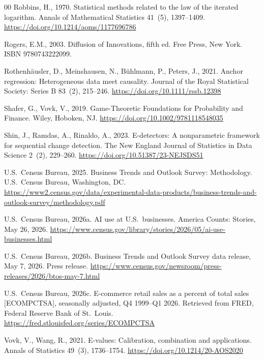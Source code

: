 \documentclass[review,authoryear,12pt]{elsarticle}
\begin{document}
\begin{thebibliography}{00}
Robbins, H., 1970. Statistical methods related to the law of the iterated logarithm. Annals of Mathematical Statistics 41~(5), 1397--1409. \url{https://doi.org/10.1214/aoms/1177696786}

Rogers, E.M., 2003. Diffusion of Innovations, fifth ed. Free Press, New York. ISBN 9780743222099.

Rothenh\"ausler, D., Meinshausen, N., B\"uhlmann, P., Peters, J., 2021. Anchor regression: Heterogeneous data meet causality. Journal of the Royal Statistical Society: Series B 83~(2), 215--246. \url{https://doi.org/10.1111/rssb.12398}

Shafer, G., Vovk, V., 2019. Game-Theoretic Foundations for Probability and Finance. Wiley, Hoboken, NJ. \url{https://doi.org/10.1002/9781118548035}

Shin, J., Ramdas, A., Rinaldo, A., 2023. E-detectors: A nonparametric framework for sequential change detection. The New England Journal of Statistics in Data Science 2~(2), 229--260. \url{https://doi.org/10.51387/23-NEJSDS51}

U.S.~Census Bureau, 2025. Business Trends and Outlook Survey: Methodology. U.S.\ Census Bureau, Washington, DC. \url{https://www2.census.gov/data/experimental-data-products/business-trends-and-outlook-survey/methodology.pdf}

U.S.~Census Bureau, 2026a. AI use at U.S.\ businesses. America Counts: Stories, May 26, 2026. \url{https://www.census.gov/library/stories/2026/05/ai-use-businesses.html}

U.S.~Census Bureau, 2026b. Business Trends and Outlook Survey data release, May 7, 2026. Press release. \url{https://www.census.gov/newsroom/press-releases/2026/btos-may-7.html}

U.S.~Census Bureau, 2026c. E-commerce retail sales as a percent of total sales [ECOMPCTSA], seasonally adjusted, Q4 1999--Q1 2026. Retrieved from FRED, Federal Reserve Bank of St.\ Louis. \url{https://fred.stlouisfed.org/series/ECOMPCTSA}

Vovk, V., Wang, R., 2021. E-values: Calibration, combination and applications. Annals of Statistics 49~(3), 1736--1754. \url{https://doi.org/10.1214/20-AOS2020}


\end{thebibliography}
\end{document}
